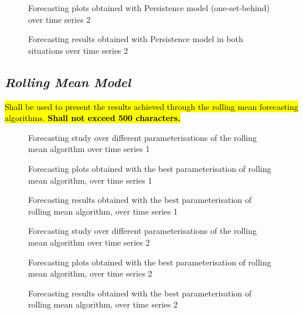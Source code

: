 \documentclass[10pt]{extarticle}
\newcommand{\ctext}[3][RGB]{%
  \begingroup
  \definecolor{hlcolor}{#1}{#2}\sethlcolor{hlcolor}%
  \hl{#3}%
  \endgroup
}
\begin{document}
\begin{figure}[H]
\caption{Forecasting plots obtained with Persistence model (one-set-behind) over time series 2}
\end{figure}

\begin{figure}[H]
\caption{Forecasting results obtained with Persistence model in both situations over time series 2}
\end{figure}

\subsection*{\textit{Rolling Mean Model}}
\ctext[RGB]{190,190,190}{Shall be used to present the results achieved through the rolling mean forecasting algorithms.  \textbf{Shall not exceed 500 characters.}}

\begin{figure}[H]
\caption{Forecasting study over different parameterisations of the rolling mean algorithm over time series 1}
\end{figure}

\begin{figure}[H]
\caption{Forecasting plots obtained with the best parameterisation of rolling mean algorithm, over time series 1}
\end{figure}

\begin{figure}[H]
\caption{Forecasting results obtained with the best parameterisation of rolling mean algorithm, over time series 1}
\end{figure}

\begin{figure}[H]
\caption{Forecasting study over different parameterisations of the rolling mean algorithm over time series 2}
\end{figure}

\begin{figure}[H]
\caption{Forecasting plots obtained with the best parameterisation of rolling mean algorithm, over time series 2}
\end{figure}

\begin{figure}[H]
\caption{Forecasting results obtained with the best parameterisation of rolling mean algorithm, over time series 2}
\end{figure}
\end{document}
